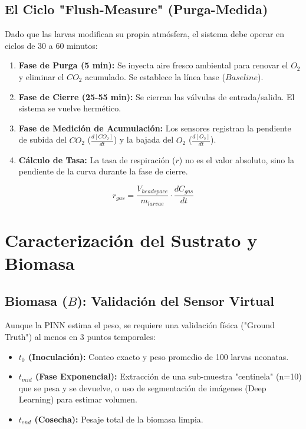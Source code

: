 \subsection{El Ciclo "Flush-Measure" (Purga-Medida)}
Dado que las larvas modifican su propia atmósfera, el sistema debe operar en ciclos de 30 a 60 minutos:
\begin{enumerate}
    \item \textbf{Fase de Purga (5 min):} Se inyecta aire fresco ambiental para renovar el $O_2$ y eliminar el $CO_2$ acumulado. Se establece la línea base ($Baseline$).
    \item \textbf{Fase de Cierre (25-55 min):} Se cierran las válvulas de entrada/salida. El sistema se vuelve hermético.
    \item \textbf{Fase de Medición de Acumulación:} Los sensores registran la pendiente de subida del $CO_2$ ($\frac{d[CO_2]}{dt}$) y la bajada del $O_2$ ($\frac{d[O_2]}{dt}$). 
    \item \textbf{Cálculo de Tasa:} La tasa de respiración ($r$) no es el valor absoluto, sino la pendiente de la curva durante la fase de cierre.
\end{enumerate}

\begin{equation}
    r_{gas} = \frac{V_{headspace}}{m_{larvae}} \cdot \frac{dC_{gas}}{dt}
\end{equation}

\section{Caracterización del Sustrato y Biomasa}

\subsection{Biomasa ($B$): Validación del Sensor Virtual}
Aunque la PINN estima el peso, se requiere una validación física ("Ground Truth") al menos en 3 puntos temporales:
\begin{itemize}
    \item \textbf{$t_0$ (Inoculación):} Conteo exacto y peso promedio de 100 larvas neonatas.
    \item \textbf{$t_{mid}$ (Fase Exponencial):} Extracción de una sub-muestra "centinela" (n=10) que se pesa y se devuelve, o uso de segmentación de imágenes (Deep Learning) para estimar volumen.
    \item \textbf{$t_{end}$ (Cosecha):} Pesaje total de la biomasa limpia.
\end{itemize}

